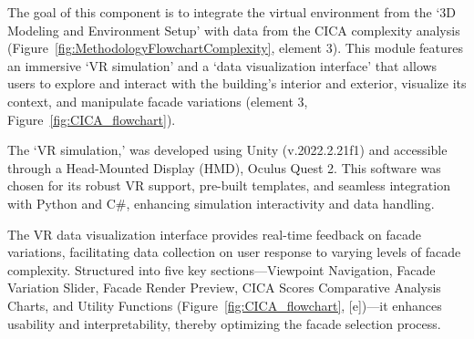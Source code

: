 %


The goal of this component is to integrate the virtual environment from the `3D Modeling and Environment Setup' with data from the CICA complexity analysis (Figure~\ref{fig:MethodologyFlowchartComplexity}, element 3).
This module features an immersive `VR simulation' and a `data visualization interface' that allows users to explore and interact with the building's interior and exterior, visualize its context, and manipulate facade variations (element 3, Figure~\ref{fig:CICA_flowchart}).

The `VR simulation,' was developed using Unity (v.2022.2.21f1) and accessible through a Head-Mounted Display (HMD), Oculus Quest 2.
This software was chosen for its robust VR support, pre-built templates, and seamless integration with Python and C\#, enhancing simulation interactivity and data handling.

The VR data visualization interface provides real-time feedback on facade variations, facilitating data collection on user response to varying levels of facade complexity.
Structured into five key sections—Viewpoint Navigation, Facade Variation Slider, Facade Render Preview, CICA Scores Comparative Analysis Charts, and Utility Functions (Figure~\ref{fig:CICA_flowchart}, [e])—it enhances usability and interpretability, thereby optimizing the facade selection process.





